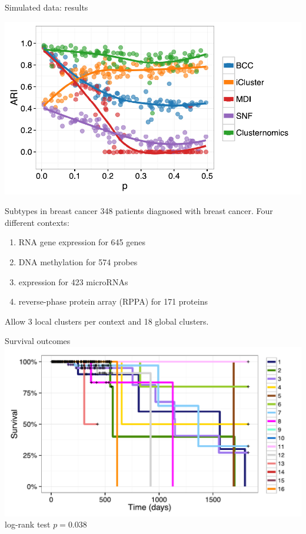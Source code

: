 \documentclass[t, final]{beamer}
\begin{document}
\begin{frame}{}
\begin{columns}[t]
\begin{column}{.32\linewidth}
\begin{block}{Simulated data: results}

  \includegraphics[width=\textwidth]{Figures/simulated-ARI-misspecified}
\end{block}

\begin{block}{Subtypes in breast cancer}
  348 patients diagnosed with breast cancer.
  Four different contexts:
  \begin{enumerate}
    \item RNA gene expression for 645 genes
    \item DNA methylation for 574 probes
    \item expression for 423 microRNAs
    \item reverse-phase protein array (RPPA) for 171 proteins
  \end{enumerate}
  Allow 3 local clusters per context and 18 global clusters.
\end{block}



\begin{block}{Survival outcomes}
  \includegraphics[width=\textwidth]{Figures/breast-survival} \\
  log-rank test $p = 0.038$
\end{block}


\end{column}
\end{columns}
\end{frame}
\end{document}
